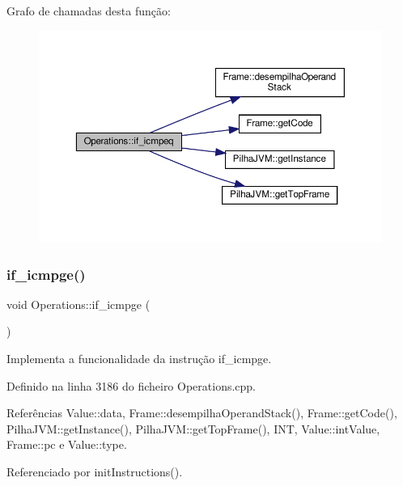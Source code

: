 Grafo de chamadas desta função\+:\nopagebreak
\begin{figure}[H]
\begin{center}
\leavevmode
\includegraphics[width=350pt]{classOperations_a43a49ccd4f1160c0b1968af4296fa2b3_cgraph}
\end{center}
\end{figure}
\mbox{\label{classOperations_a147f088fabd19030a535ac68ff091be1}} 
\subsubsection{\texorpdfstring{if\+\_\+icmpge()}{if\_icmpge()}}
{\footnotesize\ttfamily void Operations\+::if\+\_\+icmpge (\begin{DoxyParamCaption}{ }\end{DoxyParamCaption})\hspace{0.3cm}{\ttfamily [private]}}



Implementa a funcionalidade da instrução if\+\_\+icmpge. 



Definido na linha 3186 do ficheiro Operations.\+cpp.



Referências Value\+::data, Frame\+::desempilha\+Operand\+Stack(), Frame\+::get\+Code(), Pilha\+J\+V\+M\+::get\+Instance(), Pilha\+J\+V\+M\+::get\+Top\+Frame(), I\+NT, Value\+::int\+Value, Frame\+::pc e Value\+::type.



Referenciado por init\+Instructions().

